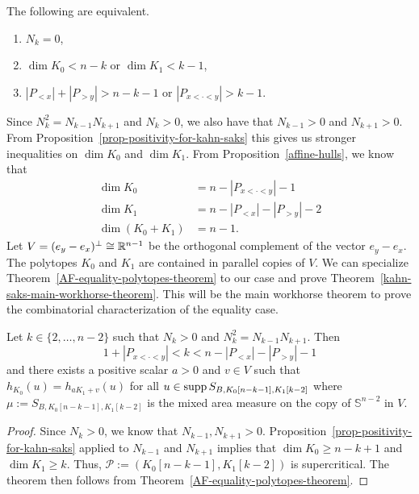 \documentclass{puthesis-UG}
\begin{document}
\begin{prop} \label{prop-positivity-for-kahn-saks}
	The following are equivalent. 
	\begin{enumerate}[label = (\alph*)]
		\item $N_k = 0$, 
		\item $\dim K_0 < n-k$ or $\dim K_1 < k-1$, 
		\item $|P_{< x}| + |P_{> y}| > n-k-1$ or $|P_{x < \cdot < y}| > k-1$. 
	\end{enumerate}
\end{prop}

Since $N_k^2 = N_{k-1} N_{k+1}$ and $N_k > 0$, we also have that $N_{k-1} > 0$ and $N_{k+1} > 0$. From Proposition~\ref{prop-positivity-for-kahn-saks} this gives us stronger inequalities on $\dim K_0$ and $\dim K_1$. From Proposition~\ref{affine-hulls}, we know that
\begin{align*}
	\dim K_0 & = n - |P_{x < \cdot < y}| - 1 \\
	\dim K_1 & = n - |P_{<x}| - |P_{> y}| - 2 \\
	\dim (K_0 + K_1) & = n-1. 
\end{align*}
Let $V = (e_y - e_x)^\perp \cong \mathbb{R}^{n-1}$ be the orthogonal complement of the vector $e_y - e_x$. The polytopes $K_0$ and $K_1$ are contained in parallel copies of $V$. We can specialize Theorem~\ref{AF-equality-polytopes-theorem} to our case and prove Theorem~\ref{kahn-saks-main-workhorse-theorem}. This will be the main workhorse theorem to prove the combinatorial characterization of the equality case. 

\begin{thm} \label{kahn-saks-main-workhorse-theorem}
	Let $k \in \{2, \ldots, n-2\}$ such that $N_k > 0$ and $N_k^2 = N_{k-1} N_{k+1}$. Then 
	\[
		1 + |P_{x < \cdot < y}| < k < n - |P_{< x}| - |P_{> y}| - 1
	\]
	and there exists a positive scalar $a > 0$ and $v \in V$ such that $h_{K_0}(u) = h_{aK_1 + v}(u)$ for all $u \in \operatorname{supp} S_{B, K_0[n-k-1], K_1[k-2]}$ where $\mu := S_{B, K_0[n-k-1], K_1[k-2]}$ is the mixed area measure on the copy of $\mathbb{S}^{n-2}$ in $V$. 
\end{thm}

\begin{proof}
	Since $N_k > 0$, we know that $N_{k-1}, N_{k+1} > 0$. Proposition~\ref{prop-positivity-for-kahn-saks} applied to $N_{k-1}$ and $N_{k+1}$ implies that $\dim K_0 \geq n-k+1$ and $\dim K_1 \geq k$. Thus, $\mathcal{P} := (K_0[n-k-1], K_1[k-2])$ is supercritical. The theorem then follows from Theorem~\ref{AF-equality-polytopes-theorem}. 
\end{proof}
\end{document}
